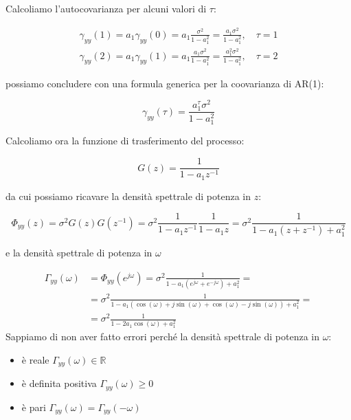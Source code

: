 \begin{esempio}
Calcoliamo l'autocovarianza per alcuni valori di $\tau$:

  \begin{align*}
    \gamma_{yy}(1)=a_1\gamma_{yy}(0)=a_1\frac{\sigma^2}{1-a_1^2}=\frac{a_1\sigma^2}{1-a_1^2},\quad \tau=1\\
    \gamma_{yy}(2)=a_1\gamma_{yy}(1)=a_1\frac{a_1\sigma^2}{1-a_1^2}=\frac{a_1^2\sigma^2}{1-a_1^2},\quad \tau=2
  \end{align*}

possiamo concludere con una formula generica per la coovarianza di AR(1):

  \[ \gamma_{yy}(\tau)=\frac{a_1^\tau\sigma^2}{1-a_1^2} \]
  
Calcoliamo ora la funzione di trasferimento del processo:

  \[ G(z)=\frac{1}{1-a_1z^{-1}} \]
  
da cui possiamo ricavare la densità spettrale di potenza in $z$:

  \[ \Phi_{yy}(z)=\sigma^2G(z)G(z^{-1})=\sigma^2\frac{1}{1-a_1z^{-1}}\frac{1}{1-a_1z}=\sigma^2\frac{1}{1-a_1(z+z^{-1})+a_1^2} \]

e la densità spettrale di potenza in $\omega$

  \[ 
    \begin{split}
      \Gamma_{yy}(\omega)&=\Phi_{yy}(e^{j\omega})=\sigma^2\frac{1}{1-a_1(e^{j\omega}+e^{-j\omega})+a_1^2}= \\
      &=\sigma^2\frac{1}{1-a_1(\cos(\omega)+j\sin(\omega)+\cos(\omega)-j\sin(\omega))+a_1^2}=\\
      &=\sigma^2\frac{1}{1-2a_1\cos(\omega)+a_1^2}
    \end{split}
  \]
Sappiamo di non aver fatto errori perché la densità spettrale di potenza in $\omega$:
\begin{itemize}
   \item è reale $\Gamma_{yy}(\omega)\in \mathbb{R}$
   \item è definita positiva $\Gamma_{yy}(\omega) \geq 0$
   \item è pari $\Gamma_{yy}(\omega) =\Gamma_{yy}(-\omega)$
 \end{itemize}
$\quad$
\end{esempio}
